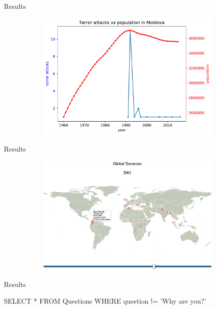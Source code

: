 \documentclass{beamer}
\begin{document}
\begin{frame}{Results}
\begin{figure}
\begin{subfigure}[b]{0.3\textwidth}
			\includegraphics[width=\textwidth]{Population-Terror/attackVsPopulationMoldova}
		\end{subfigure}
	\end{figure}
\end{frame}


\begin{frame}{Results}
	\begin{figure}
		\begin{subfigure}[b]{\textwidth}
			\includegraphics[width=\textwidth]{911.png}
		\end{subfigure}
	\end{figure}
\end{frame}


\begin{frame}{Results}
	
\end{frame}


\begin{frame}
	SELECT * FROM Questions WHERE question != 'Why are you?'
\end{frame}
\end{document}
